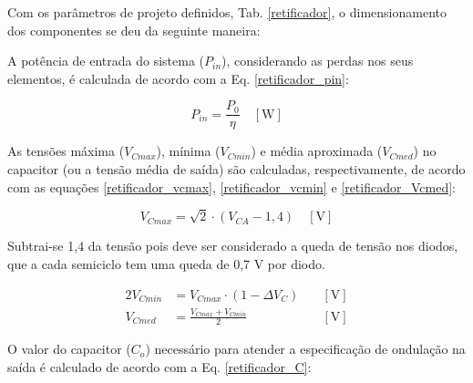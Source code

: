 \begin{apendicesenv}
Com os parâmetros de projeto definidos, Tab. \ref{retificador}, o dimensionamento dos componentes se deu da seguinte maneira:

A potência de entrada do sistema ($P_{in}$), considerando as perdas nos seus elementos, é calculada de acordo com a Eq. \ref{retificador_pin}:
    
    \begin{equation}
        P_{in} = \frac{P_{0}}{\eta} \quad [\text{W}]
        \label{retificador_pin}
    \end{equation}

As tensões máxima ($V_{Cmax}$), mínima ($V_{Cmin}$) e média aproximada ($V_{Cmed}$) no capacitor (ou a tensão média de saída) são calculadas, respectivamente, de acordo com as equações \ref{retificador_vcmax},  \ref{retificador_vcmin} e \ref{retificador_Vcmed}:
    
    \begin{equation}
        V_{Cmax} = \sqrt{2} \cdot \left( V_{CA} - 1,4 \right) \quad [\text{V}]
        \label{retificador_vcmax}
    \end{equation}
    
Subtrai-se 1,4 da tensão pois deve ser considerado a queda de tensão nos diodos, que a cada semiciclo tem uma queda de 0,7 V por diodo.

    
    \begin{alignat}{2}
        \label{retificador_vcmin}
        V_{Cmin} & = V_{Cmax} \cdot \left( 1 - \Delta V_{C}  \right) \quad & [\text{V}] \\
        \label{retificador_Vcmed}
        V_{Cmed} & = \frac{V_{Cmax} + V_{Cmin}}{2} \quad & [\text{V}]
    \end{alignat}
    
    
    
O valor do capacitor ($C_{o}$) necessário para atender a especificação de ondulação na saída é calculado de acordo com a Eq. \ref{retificador_C}:
    

\end{apendicesenv}

